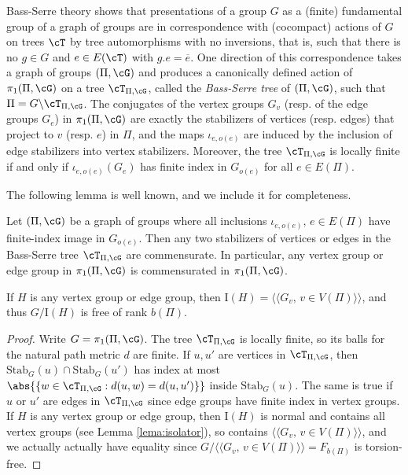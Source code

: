 \documentclass[reqno]{amsart}
\begin{document}
Bass-Serre theory \cite[]{Serre1977} shows that presentations of a group $G$ as a (finite) fundamental group of a graph of groups are in correspondence with (cocompact) actions of $G$ on trees $\cT$ by tree automorphisms with no inversions, that is, such that there is no $g \in G$ and $e \in E(\cT)$ with $g.e = \overline{e}$. One direction of this correspondence takes a graph of groups $(\Pi, \cG)$ and produces a canonically defined action of $\pi_1(\Pi, \cG)$ on a tree $\cT_{\Pi, \cG}$, called the \emph{Bass-Serre tree} of $(\Pi, \cG)$, such that $\Pi = G\backslash \cT_{\Pi, \cG}$. The conjugates of the vertex groups $G_v$ (resp. of the edge groups $G_e$) in $\pi_1(\Pi, \cG)$ are exactly the stabilizers of vertices (resp. edges) that project to $v$ (resp. $e$) in $\Pi$, and the maps $\iota_{e, o(e)}$ are induced by the inclusion of edge stabilizers into vertex stabilizers. Moreover, the tree $\cT_{\Pi, \cG}$ is locally finite if and only if $\iota_{e, o(e)}(G_e)$ has finite index in $G_{o(e)}$ for all $e \in E(\Pi)$.

The following lemma is well known, and we include it for completeness.

\begin{lema}\label{lema:commensurated-graphs}
Let $(\Pi, \cG)$ be a graph of groups where all inclusions $\iota_{e, o(e)},\, e \in E(\Pi)$ have finite-index image in $G_{o(e)}$. Then any two stabilizers of vertices or edges in the Bass-Serre tree $\cT_{\Pi, \cG}$ are commensurate. In particular, any vertex group or edge group in $\pi_1(\Pi, \cG)$ is commensurated in $\pi_1(\Pi, \cG)$.

If $H$ is any vertex group or edge group, then  $\mathrm{I}(H)=\langle \langle G_v,\, v \in V(\Pi)\rangle \rangle$, and thus $G/\mathrm{I}(H)$ is free of rank $b(\Pi)$.
\end{lema}

\begin{proof}
Write $G = \pi_1(\Pi, \cG)$. The tree $\cT_{\Pi, \cG}$ is locally finite, so its balls for the natural path metric $d$ are finite. If $u,u'$ are vertices in $\cT_{\Pi, \cG}$, then $\mathrm{Stab}_G(u) \cap \mathrm{Stab}_G(u')$ has index at most $\abs{\{w \in \cT_{\Pi, \cG} : d(u,w)= d(u,u')\}}$ inside $\mathrm{Stab}_G(u)$. The same is true if $u$ or $u'$ are edges in $\cT_{\Pi, \cG}$ since edge groups have finite index in vertex groups.
If $H$ is any vertex group or edge group, then  $\mathrm{I}(H)$ is normal and contains all vertex groups (see Lemma \ref{lema:isolator}), so contains $\langle \langle G_v,\, v \in V(\Pi)\rangle \rangle$, and we actually actually have equality since  $G/\langle \langle G_v,\, v \in V(\Pi)\rangle \rangle=F_{b(\Pi)}$ is torsion-free. \qedhere


\end{proof}
\end{document}
